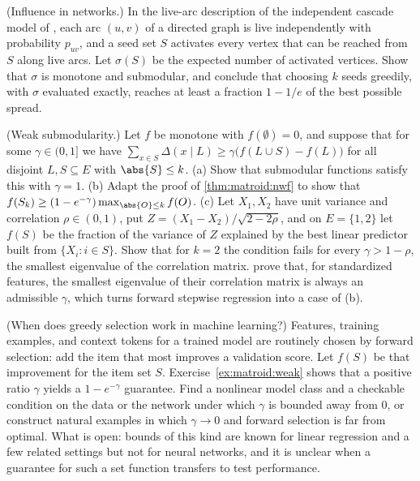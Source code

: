\begin{refsection}
\begin{exercises}
\item \transfer\label{ex:matroid:influence} (Influence in networks.) In the live-arc description of the independent cascade model of \textcite{KempeKleinbergTardos2003}, each arc $(u,v)$ of a directed graph is live independently with probability $p_{uv}$, and a seed set $S$ activates every vertex that can be reached from $S$ along live arcs. Let $\sigma(S)$ be the expected number of activated vertices. Show that $\sigma$ is monotone and submodular, and conclude that choosing $k$ seeds greedily, with $\sigma$ evaluated exactly, reaches at least a fraction $1-1/e$ of the best possible spread. 

\item \transfer\label{ex:matroid:weak} (Weak submodularity.) Let $f$ be monotone with $f(\emptyset)=0$, and suppose that for some $\gamma\in(0,1]$ we have $\sum_{x\in S}\Delta(x\mid L)\ge\gamma\bigl(f(L\cup S)-f(L)\bigr)$ for all disjoint $L,S\subseteq E$ with $\abs{S}\le k$. (a) Show that submodular functions satisfy this with $\gamma=1$. (b) Adapt the proof of \cref{thm:matroid:nwf} to show that $f(S_k)\ge(1-e^{-\gamma})\max_{\abs{O}\le k}f(O)$. (c) Let $X_1,X_2$ have unit variance and correlation $\rho\in(0,1)$, put $Z=(X_1-X_2)/\sqrt{2-2\rho}$, and on $E=\{1,2\}$ let $f(S)$ be the fraction of the variance of $Z$ explained by the best linear predictor built from $\{X_i: i\in S\}$. Show that for $k=2$ the condition fails for every $\gamma>1-\rho$, the smallest eigenvalue of the correlation matrix. \textcite{DasKempe2011} prove that, for standardized features, the smallest eigenvalue of their correlation matrix is always an admissible $\gamma$, which turns forward stepwise regression into a case of (b).

\item \research\label{ex:matroid:research-ml} (When does greedy selection work in machine learning?) Features, training examples, and context tokens for a trained model are routinely chosen by forward selection: add the item that most improves a validation score. Let $f(S)$ be that improvement for the item set $S$. Exercise~\ref{ex:matroid:weak} shows that a positive ratio $\gamma$ yields a $1-e^{-\gamma}$ guarantee. Find a nonlinear model class and a checkable condition on the data or the network under which $\gamma$ is bounded away from $0$, or construct natural examples in which $\gamma\to0$ and forward selection is far from optimal. What is open: bounds of this kind are known for linear regression and a few related settings but not for neural networks, and it is unclear when a guarantee for such a set function transfers to test performance.


\end{exercises}
\end{refsection}
